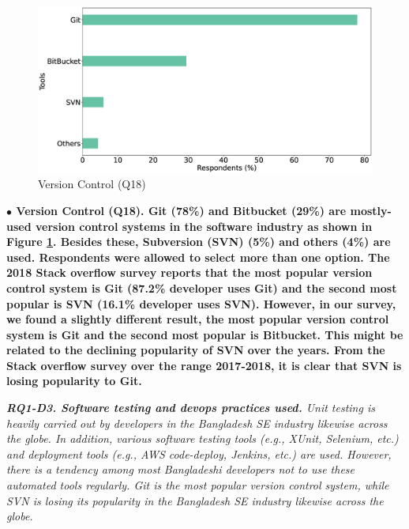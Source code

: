 \begin{figure}[h]
\centering
  \includegraphics[scale=0.16]{Figures/Respondents_version_control}
  \caption{Version Control (Q18)}
  \label{fig:versionControl}
\end{figure}
\nd\bf{$\bullet$ Version Control (Q18).} Git (78\%) and Bitbucket (29\%) are mostly-used
version control systems in the software industry as shown in Figure
\ref{fig:versionControl}. Besides these, Subversion (SVN) (5\%) and others (4\%)
are used.  Respondents were allowed to select more than one option. The 2018
Stack overflow survey\citep{StackoverflowSurvey2018} reports that the most
popular version control system is Git (87.2\% developer uses Git) and the second
most popular is SVN (16.1\% developer uses SVN). However, in our survey, we
found a slightly different result, the most popular version control system is
Git and the second most popular is Bitbucket. This might be related to the
declining popularity of SVN over the years. From the Stack overflow survey over
the range 2017-2018, it is clear that SVN is losing popularity to Git. 

\begin{tcolorbox}[flushleft upper,boxrule=1pt,arc=0pt,left=0pt,right=0pt,top=0pt,bottom=0pt,colback=white,after=\ignorespacesafterend\par\noindent]
\nd\it{\bf{RQ1-D3. Software testing and devops practices used.}} Unit testing is
heavily carried out by developers in the Bangladesh SE industry likewise across
the globe. In addition, various software testing
tools (e.g., XUnit, Selenium, etc.) and deployment tools (e.g., AWS code-deploy,
Jenkins, etc.) are used. However, there is a tendency among most
Bangladeshi developers not to use these automated tools regularly. 
Git is the most popular version control system, while SVN is losing
its popularity in the Bangladesh SE industry likewise across the globe.
\end{tcolorbox}
